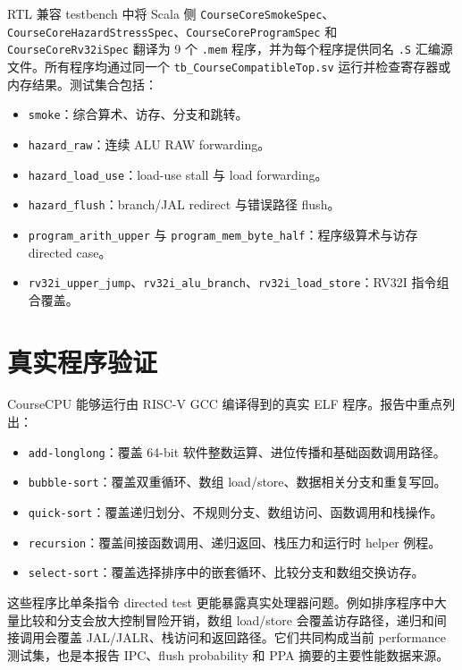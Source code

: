 \documentclass[UTF8,a4paper,12pt]{ctexrep}
\begin{document}
RTL 兼容 testbench 中将 Scala 侧 \texttt{CourseCoreSmokeSpec}、\texttt{CourseCoreHazardStressSpec}、\texttt{CourseCoreProgramSpec} 和 \texttt{CourseCoreRv32iSpec} 翻译为 9 个 \texttt{.mem} 程序，并为每个程序提供同名 \texttt{.S} 汇编源文件。所有程序均通过同一个 \texttt{tb\_CourseCompatibleTop.sv} 运行并检查寄存器或内存结果。测试集合包括：

\begin{itemize}
  \item \texttt{smoke}：综合算术、访存、分支和跳转。
  \item \texttt{hazard\_raw}：连续 ALU RAW forwarding。
  \item \texttt{hazard\_load\_use}：load-use stall 与 load forwarding。
  \item \texttt{hazard\_flush}：branch/JAL redirect 与错误路径 flush。
  \item \texttt{program\_arith\_upper} 与 \texttt{program\_mem\_byte\_half}：程序级算术与访存 directed case。
  \item \texttt{rv32i\_upper\_jump}、\texttt{rv32i\_alu\_branch}、\texttt{rv32i\_load\_store}：RV32I 指令组合覆盖。
\end{itemize}

\section{真实程序验证}

CourseCPU 能够运行由 RISC-V GCC 编译得到的真实 ELF 程序。报告中重点列出：

\begin{itemize}
  \item \texttt{add-longlong}：覆盖 64-bit 软件整数运算、进位传播和基础函数调用路径。
  \item \texttt{bubble-sort}：覆盖双重循环、数组 load/store、数据相关分支和重复写回。
  \item \texttt{quick-sort}：覆盖递归划分、不规则分支、数组访问、函数调用和栈操作。
  \item \texttt{recursion}：覆盖间接函数调用、递归返回、栈压力和运行时 helper 例程。
  \item \texttt{select-sort}：覆盖选择排序中的嵌套循环、比较分支和数组交换访存。
\end{itemize}

这些程序比单条指令 directed test 更能暴露真实处理器问题。例如排序程序中大量比较和分支会放大控制冒险开销，数组 load/store 会覆盖访存路径，递归和间接调用会覆盖 JAL/JALR、栈访问和返回路径。它们共同构成当前 performance 测试集，也是本报告 IPC、flush probability 和 PPA 摘要的主要性能数据来源。
\end{document}
